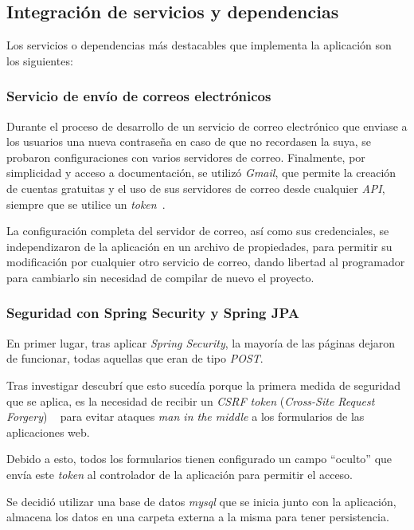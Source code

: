 \subsection{Integración de servicios y dependencias}

Los servicios o dependencias más destacables que implementa la aplicación son los siguientes:

\subsubsection{Servicio de envío de correos electrónicos}

Durante el proceso de desarrollo de un servicio de correo electrónico que enviase a los usuarios una nueva contraseña en caso de que no recordasen la suya, se probaron configuraciones con varios servidores de correo. Finalmente, por simplicidad y acceso a documentación, se utilizó \textit{Gmail}, que permite la creación de cuentas gratuitas y el uso de sus servidores de correo desde cualquier \textit{API}, siempre que se utilice un \textit{token}~\cite{gmail
}.

La configuración completa del servidor de correo, así como sus credenciales, se independizaron de la aplicación en un archivo de propiedades, para permitir su modificación por cualquier otro servicio de correo, dando libertad al programador para cambiarlo sin necesidad de compilar de nuevo el proyecto.

\subsubsection{Seguridad con Spring Security y Spring JPA}

En primer lugar, tras aplicar \textit{Spring Security}, la mayoría de las páginas dejaron de funcionar, todas aquellas que eran de tipo \textit{POST}.

Tras investigar descubrí que esto sucedía porque la primera medida de seguridad que se aplica, es la necesidad de recibir un \textit{CSRF token} (\textit{Cross-Site Request Forgery}) ~\cite{web:csrf} para evitar ataques \textit{man in the middle} a los formularios de las aplicaciones web.

Debido a esto, todos los formularios tienen configurado un campo ``oculto'' que envía este \textit{token} al controlador de la aplicación para permitir el acceso.

Se decidió utilizar una base de datos \textit{mysql} que se inicia junto con la aplicación, almacena los datos en una carpeta externa a la misma para tener persistencia.

